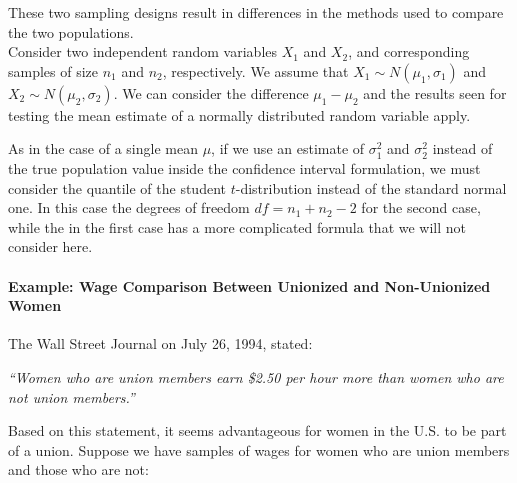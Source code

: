 \documentclass[
]{article}
\begin{document}
These two sampling designs result in differences in the methods used to
compare the two populations.\\
Consider two independent random variables \(X_1\) and \(X_2\), and
corresponding samples of size \(n_1\) and \(n_2\), respectively. We
assume that \(X_1\sim N(\mu_1,\sigma_1)\) and
\(X_2\sim N(\mu_2,\sigma_2)\). We can consider the difference
\(\mu_1 - \mu_2\) and the results seen for testing the mean estimate of
a normally distributed random variable apply.

As in the case of a single mean \(\mu\), if we use an estimate of
\(\sigma^2_1\) and \(\sigma^2_2\) instead of the true population value
inside the confidence interval formulation, we must consider the
quantile of the student \(t\)-distribution instead of the standard
normal one. In this case the degrees of freedom \(df = n_1 + n_2 -2\)
for the second case, while the in the first case has a more complicated
formula that we will not consider here.

\hypertarget{example-wage-comparison-between-unionized-and-non-unionized-women}{%
\paragraph{Example: Wage Comparison Between Unionized and Non-Unionized
Women}\label{example-wage-comparison-between-unionized-and-non-unionized-women}}

The Wall Street Journal on July 26, 1994, stated:

\emph{``Women who are union members earn \$2.50 per hour more than women
who are not union members.''}

Based on this statement, it seems advantageous for women in the U.S. to
be part of a union. Suppose we have samples of wages for women who are
union members and those who are not:
\end{document}
